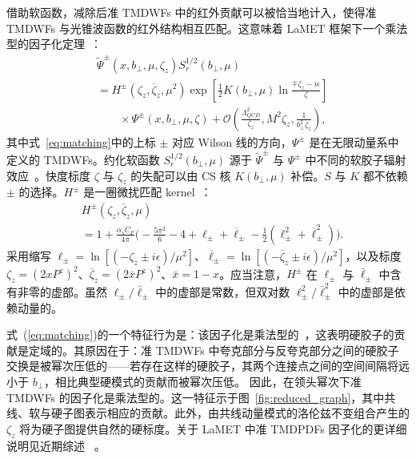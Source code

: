 借助软函数，减除后准 TMDWFs 中的红外贡献可以被恰当地计入，使得准 TMDWFs 与光锥波函数的红外结构相互匹配。这意味着 LaMET 框架下一个乘法型的因子化定理~\cite{Ebert:2019okf,Ji:2019sxk,Ji:2019ewn,Ji:2021znw,Ebert:2022fmh}：
\begin{align}
&\tilde \Psi^{\pm}(x, b_{\perp}, \mu, \zeta_z) S_r^{1/2}(b_{\perp}, \mu) \nonumber\\
&= H^{\pm}\left(\zeta_z, \overline\zeta_z, \mu^2\right) \exp\left[\frac{1}{2}K(b_{\perp},\mu)\ln\frac{\mp\zeta_z- i\epsilon}{\zeta} \right]  \nonumber\\
& \qquad\times \Psi^{\pm}(x, b_\perp, \mu, \zeta)+\mathcal{O}\left(\frac{\Lambda_{QCD}^2}{\zeta_z}, M^2\zeta_z,\frac{1}{b_{\perp}^2\zeta_z}\right),
\label{eq:matching}
\end{align}
其中式~\eqref{eq:matching}中的上标 $\pm$ 对应 Wilson 线的方向，$\Psi^{\pm}$ 是在无限动量系中定义的 TMDWFs。约化软函数 $S^{1/2}_r(b_{\perp}, \mu)$ 源于 $\tilde \Psi^{\pm}$ 与 $\Psi^{\pm}$ 中不同的软胶子辐射效应~\cite{Ji:2021znw}。快度标度 $\zeta$ 与 $\zeta_z$ 的失配可以由 CS 核 $K(b_{\perp},\mu)$ 补偿。$S$ 与 $K$ 都不依赖 $\pm$ 的选择。$H^{\pm}$ 是一圈微扰匹配 kernel~\cite{Ji:2021znw}：
\begin{align}
& H^{\pm}(\zeta_z, \overline{\zeta}_z,\mu) \nonumber\\
& = 1+  \frac{ \alpha_s C_F}{4\pi} \bigg(-\frac{5\pi^2}{6}-4 +{\ell}_{\pm} + \overline \ell_{\pm} - \frac{1}{2} ({\ell}_{\pm}^2 + \overline \ell_{\pm}^2) \bigg).  \label{eq:1loophardkernel}
\end{align}
采用缩写 ${\ell}_{\pm} = \ln \left[(-\zeta_z \pm i\epsilon)/\mu^2\right]$、$\overline {\ell}_{\pm} = \ln \left[(-\overline \zeta_z \pm i\epsilon)/\mu^2\right]$，以及标度 $\zeta_z = (2x P^z)^2$、$\overline\zeta_z = \left(2\bar{x} P^z\right)^2$、$\bar{x}=1-x$。应当注意，$H^{\pm}$ 在 $\ell_{\pm}$ 与 $\bar{\ell}_{\pm}$ 中含有非零的虚部。虽然 $\ell_{\pm}/\bar{\ell}_{\pm}$ 中的虚部是常数，但双对数 ${\ell}_{\pm}^2/\bar{\ell}_{\pm}^2$ 中的虚部是依赖动量的。

式~(\ref{eq:matching})的一个特征行为是：该因子化是乘法型的~\cite{Ji:2020ect}，这表明硬胶子的贡献是定域的。其原因在于：准 TMDWFs 中夸克部分与反夸克部分之间的硬胶子交换是被幂次压低的——若存在这样的硬胶子，其两个连接点之间的空间间隔将远小于 $b_{\perp}$，相比典型硬模式的贡献而被幂次压低。
因此，在领头幂次下准 TMDWFs 的因子化是乘法型的。这一特征示于图~\ref{fig:reduced_graph}，其中共线、软与硬子图表示相应的贡献。此外，由共线动量模式的洛伦兹不变组合产生的 $\zeta_z$ 将为硬子图提供自然的硬标度。关于 LaMET 中准 TMDPDFs 因子化的更详细说明见近期综述~ \cite{Ji:2019ewn}。



